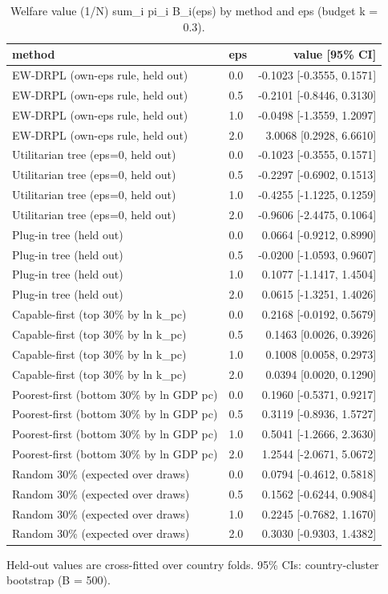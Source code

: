 \begin{table}[htbp]
\centering
\caption{Welfare value (1/N) sum\_i pi\_i B\_i(eps) by method and eps (budget k = 0.3).}
\label{tab:policy_values}
\begin{tabular}{llr}
\toprule
method & eps & value [95\% CI] \\
\midrule
EW-DRPL (own-eps rule, held out) & 0.0 & -0.1023 [-0.3555, 0.1571] \\
EW-DRPL (own-eps rule, held out) & 0.5 & -0.2101 [-0.8446, 0.3130] \\
EW-DRPL (own-eps rule, held out) & 1.0 & -0.0498 [-1.3559, 1.2097] \\
EW-DRPL (own-eps rule, held out) & 2.0 & 3.0068 [0.2928, 6.6610] \\
Utilitarian tree (eps=0, held out) & 0.0 & -0.1023 [-0.3555, 0.1571] \\
Utilitarian tree (eps=0, held out) & 0.5 & -0.2297 [-0.6902, 0.1513] \\
Utilitarian tree (eps=0, held out) & 1.0 & -0.4255 [-1.1225, 0.1259] \\
Utilitarian tree (eps=0, held out) & 2.0 & -0.9606 [-2.4475, 0.1064] \\
Plug-in tree (held out) & 0.0 & 0.0664 [-0.9212, 0.8990] \\
Plug-in tree (held out) & 0.5 & -0.0200 [-1.0593, 0.9607] \\
Plug-in tree (held out) & 1.0 & 0.1077 [-1.1417, 1.4504] \\
Plug-in tree (held out) & 2.0 & 0.0615 [-1.3251, 1.4026] \\
Capable-first (top 30\% by ln k\_pc) & 0.0 & 0.2168 [-0.0192, 0.5679] \\
Capable-first (top 30\% by ln k\_pc) & 0.5 & 0.1463 [0.0026, 0.3926] \\
Capable-first (top 30\% by ln k\_pc) & 1.0 & 0.1008 [0.0058, 0.2973] \\
Capable-first (top 30\% by ln k\_pc) & 2.0 & 0.0394 [0.0020, 0.1290] \\
Poorest-first (bottom 30\% by ln GDP pc) & 0.0 & 0.1960 [-0.5371, 0.9217] \\
Poorest-first (bottom 30\% by ln GDP pc) & 0.5 & 0.3119 [-0.8936, 1.5727] \\
Poorest-first (bottom 30\% by ln GDP pc) & 1.0 & 0.5041 [-1.2666, 2.3630] \\
Poorest-first (bottom 30\% by ln GDP pc) & 2.0 & 1.2544 [-2.0671, 5.0672] \\
Random 30\% (expected over draws) & 0.0 & 0.0794 [-0.4612, 0.5818] \\
Random 30\% (expected over draws) & 0.5 & 0.1562 [-0.6244, 0.9084] \\
Random 30\% (expected over draws) & 1.0 & 0.2245 [-0.7682, 1.1670] \\
Random 30\% (expected over draws) & 2.0 & 0.3030 [-0.9303, 1.4382] \\
\bottomrule
\end{tabular}
\par\smallskip\footnotesize Held-out values are cross-fitted over country folds. 95\% CIs: country-cluster bootstrap (B = 500).
\end{table}
